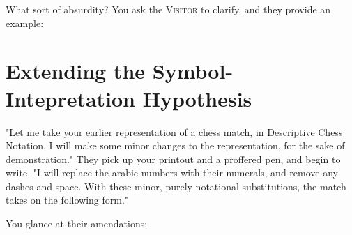 What sort of absurdity? You ask the \textsc{Visitor} to clarify, and they provide an example:

\section{Extending the Symbol-Intepretation Hypothesis}

"Let me take your earlier representation of a chess match, in Descriptive Chess Notation. I will make some minor changes to the representation, for the sake of demonstration." They pick up your printout and a proffered pen, and begin to write. "I will replace the arabic numbers with their numerals, and remove any dashes and space. With these minor, purely notational substitutions, the match takes on the following form."

You glance at their amendations:


\noindent
\begin{center}
\end{center}

